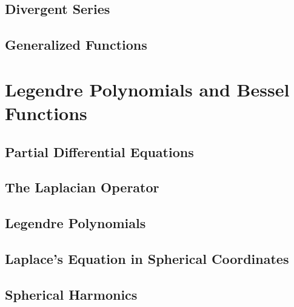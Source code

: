 \documentclass[conference,12pt,onecolumn,compsoc]{IEEEtran}
\begin{document}
\subsection{Divergent Series}
\label{section: Divergent Series}

\subsection{Generalized Functions}
\label{section: Generalized Functions}




\section{Legendre Polynomials and Bessel Functions}
\label{section: Legendre Polynomials and Bessel Functions}

\subsection{Partial Differential Equations}
\label{section: Partial Differential Equations}

\subsection{The Laplacian Operator}
\label{section: The Laplacian Operator}

\subsection{Legendre Polynomials}
\label{section: Legendre Polynomials}

\subsection{Laplace's Equation in Spherical Coordinates}
\label{section: Laplace's Equation in Spherical Coordinates}

\subsection{Spherical Harmonics}
\label{section: Spherical Harmonics}
\end{document}
